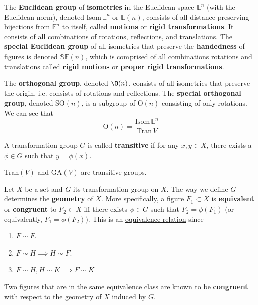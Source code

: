   \begin{definition}[Isometries]
    \label{def:isometries}
    The \textbf{Euclidean group} of \textbf{isometries} in the Euclidean space $\mathbb{E}^{n}$ (with the Euclidean norm), denoted Isom$\, \mathbb{E}^{n}$ or $\mathbb{E}(n)$, consists of all distance-preserving bijections from $\mathbb{E}^{n}$ to itself, called \textbf{motions} or \textbf{rigid transformations}. It consists of all combinations of rotations, reflections, and translations. The \textbf{special Euclidean group} of all isometries that preserve the \textbf{handedness} of figures is denoted $\mathbb{SE}(n)$, which is comprised of all combinations rotations and translations called \textbf{rigid motions} or \textbf{proper rigid transformations}.
  \end{definition}

  \begin{definition}
    \label{def:orthogonal-group}
    The \textbf{orthogonal group}, denoted $\O(n)$, consists of all isometries that preserve the origin, i.e. consists of rotations and reflections. The \textbf{special orthogonal group}, denoted SO$(n)$, is a subgroup of O$(n)$ consisting of only rotations. We can see that 
    \begin{equation}
      \text{O}(n)=\frac{\text{Isom}\, \mathbb{E}^{n}}{\text{Tran}\,V}
    \end{equation}
  \end{definition}

  \begin{definition}[Transitive]
    \label{def:transitive}
    A transformation group $G$ is called \textbf{transitive} if for any $x, y \in X$, there exists a $\phi \in G$ such that $y = \phi(x)$. 
  \end{definition}

  \begin{example}
    \label{ex:transitivity-of-tranv-and-gav}
    Tran$(V)$ and GA$(V)$ are transitive groups. 
  \end{example}

  \begin{definition}
    \label{def:congruence-classes}
    Let $X$ be a set and $G$ its transformation group on $X$. The way we define $G$ determines the \textbf{geometry} of $X$. More specifically, a figure $F_{1} \subset X$ is \textbf{equivalent} or \textbf{congruent} to $F_{2} \subset X$ iff there exists $\phi \in G$ such that $F_{2} = \phi (F_{1})$ (or equivalently, $F_{1} = \phi (F_{2})$). This is an \hyperref[st-def:equivalence_relation]{equivalence relation} since
    \begin{enumerate}
      \item $F \sim F$. 
      \item $F \sim H \implies H \sim F$. 
      \item $F \sim H, H \sim K \implies F \sim K$
    \end{enumerate}
    Two figures that are in the same equivalence class are known to be \textbf{congruent} with respect to the geometry of $X$ induced by $G$. 
  \end{definition}

